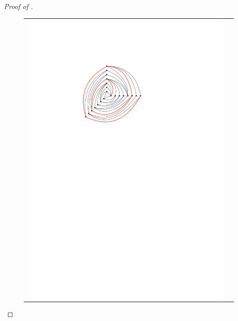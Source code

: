 \documentclass{patmorin}
\begin{document}
\begin{proof}[Proof of ]
  \begin{figure}
  \begin{center}
  \begin{tabular}{cc}
  \includegraphics{figs/graph-2}

\end{tabular}
\end{center}
\end{figure}
\end{proof}
\end{document}
